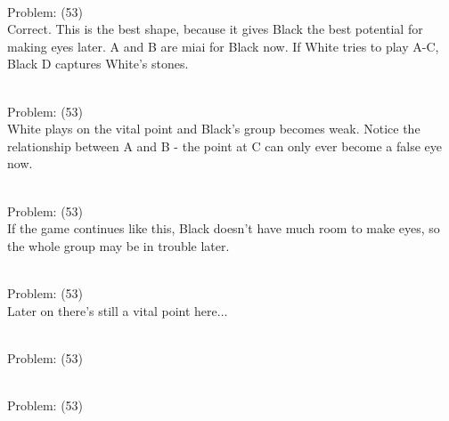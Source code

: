 \documentclass[11pt]{article}
\begin{document}
\begin{minipage}[t]{0.5\textwidth}
  {\centering
  
\\
Problem: (53)\\
Correct. This is the best shape, because it gives Black the best potential for making eyes later. A and B are miai for Black now. If White tries to play A-C, Black D captures White's stones.\\
  }
\end{minipage}
\begin{minipage}[t]{0.5\textwidth}
  {\centering
  
\\
Problem: (53)\\
White plays on the vital point and Black's group becomes weak. Notice the relationship between A and B - the point at C can only ever become a false eye now.\\
  }
\end{minipage}
\begin{minipage}[t]{0.5\textwidth}
  {\centering
  
\\
Problem: (53)\\
If the game continues like this, Black doesn't have much room to make eyes, so the whole group may be in trouble later.\\
  }
\end{minipage}
\begin{minipage}[t]{0.5\textwidth}
  {\centering
  
\\
Problem: (53)\\
Later on there's still a vital point here...\\
  }
\end{minipage}
\begin{minipage}[t]{0.5\textwidth}
  {\centering
  
\\
Problem: (53)\\
  }
\end{minipage}
\begin{minipage}[t]{0.5\textwidth}
  {\centering
  
\\
Problem: (53)\\
  }
\end{minipage}
\end{document}
